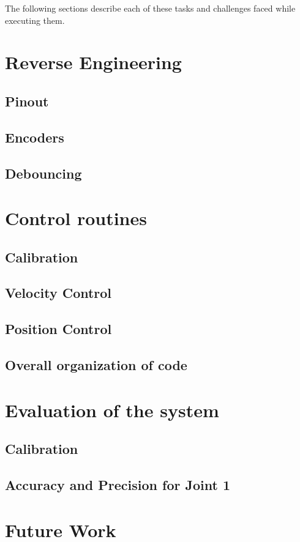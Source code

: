 \documentclass[10pt,a4paper]{article}
\begin{document}
The following sections describe each of these tasks and challenges
faced while executing them.

\section{Reverse Engineering}

\subsection{Pinout}
\subsection{Encoders}
\subsection{Debouncing}

\section{Control routines}

\subsection{Calibration}
\subsection{Velocity Control}
\subsection{Position Control}
\subsection{Overall organization of code}

\section{Evaluation of the system}

\subsection{Calibration}
\subsection{Accuracy and Precision for Joint 1}

\section{Future Work}
\end{document}
